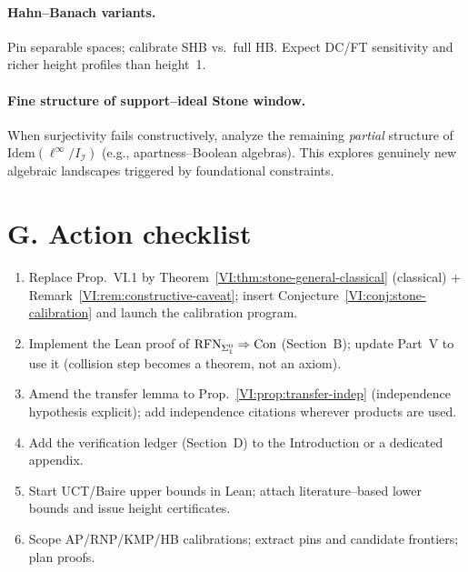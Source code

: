 \documentclass[11pt]{article}
\theoremstyle{definition}
\theoremstyle{remark}
\newcommand{\linf}{\ell^\infty}
\begin{document}
\paragraph{Hahn–Banach variants.}
Pin separable spaces; calibrate SHB vs.\ full HB. Expect DC/FT sensitivity and richer height profiles than height~1.

\paragraph{Fine structure of support–ideal Stone window.}
When surjectivity fails constructively, analyze the remaining \emph{partial} structure of $\mathrm{Idem}(\linf/I_{\mathcal I})$ (e.g., apartness–Boolean algebras). This explores genuinely new algebraic landscapes triggered by foundational constraints.

\section{G. Action checklist}

\begin{enumerate}
\item Replace Prop.~VI.1 by Theorem~\ref{VI:thm:stone-general-classical} (classical) + Remark~\ref{VI:rem:constructive-caveat}; insert Conjecture~\ref{VI:conj:stone-calibration} and launch the calibration program.
\item Implement the Lean proof of \(\mathrm{RFN}_{\Sigma^0_1}\Rightarrow\mathrm{Con}\) (Section~B); update Part~V to use it (collision step becomes a theorem, not an axiom).
\item Amend the transfer lemma to Prop.~\ref{VI:prop:transfer-indep} (independence hypothesis explicit); add independence citations wherever products are used.
\item Add the verification ledger (Section~D) to the Introduction or a dedicated appendix.
\item Start UCT/Baire upper bounds in Lean; attach literature–based lower bounds and issue height certificates.
\item Scope AP/RNP/KMP/HB calibrations; extract pins and candidate frontiers; plan proofs.
\end{enumerate}
\end{document}
